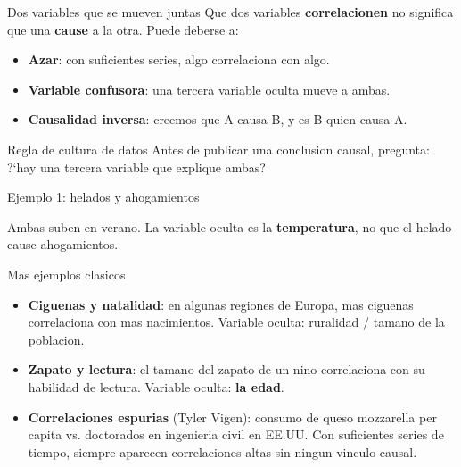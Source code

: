 \documentclass[aspectratio=169]{beamer}
\begin{document}
\begin{frame}{Dos variables que se mueven juntas}
  Que dos variables \textbf{correlacionen} no significa que una
  \textbf{cause} a la otra. Puede deberse a:
  \begin{itemize}
    \item \textbf{Azar}: con suficientes series, algo correlaciona con algo.
    \item \textbf{Variable confusora}: una tercera variable oculta mueve a
          ambas.
    \item \textbf{Causalidad inversa}: creemos que A causa B, y es B quien
          causa A.
  \end{itemize}
  \begin{block}{Regla de cultura de datos}
    Antes de publicar una conclusion causal, pregunta: ?`hay una tercera
    variable que explique ambas?
  \end{block}
\end{frame}

\begin{frame}[fragile]{Ejemplo 1: helados y ahogamientos}
  \begin{center}
  \end{center}
  Ambas suben en verano. La variable oculta es la \textbf{temperatura}, no que
  el helado cause ahogamientos.
\end{frame}

\begin{frame}{Mas ejemplos clasicos}
  \begin{itemize}
    \item \textbf{Ciguenas y natalidad}: en algunas regiones de Europa, mas
          ciguenas correlaciona con mas nacimientos. Variable oculta:
          ruralidad / tamano de la poblacion.
    \item \textbf{Zapato y lectura}: el tamano del zapato de un nino
          correlaciona con su habilidad de lectura. Variable oculta:
          \textbf{la edad}.
    \item \textbf{Correlaciones espurias} (Tyler Vigen): consumo de queso
          mozzarella per capita vs. doctorados en ingenieria civil en EE.UU.
          Con suficientes series de tiempo, siempre aparecen correlaciones
          altas sin ningun vinculo causal.
  \end{itemize}
\end{frame}
\end{document}
